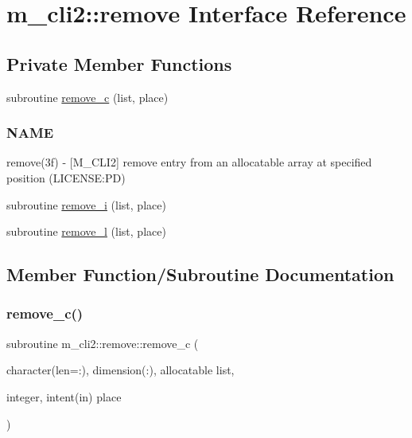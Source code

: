 \hypertarget{interfacem__cli2_1_1remove}{}\section{m\+\_\+cli2\+:\+:remove Interface Reference}
\label{interfacem__cli2_1_1remove}
\subsection*{Private Member Functions}
\begin{DoxyCompactItemize}
\item 
subroutine \mbox{\hyperlink{interfacem__cli2_1_1remove_aae13960af6c9ed2af46fdfec8e66a8a2}{remove\+\_\+c}} (list, place)
\begin{DoxyCompactList}\small\item\em \subsubsection*{N\+A\+ME}

remove(3f) -\/ \mbox{[}M\+\_\+\+C\+L\+I2\mbox{]} remove entry from an allocatable array at specified position (L\+I\+C\+E\+N\+SE\+:PD) \end{DoxyCompactList}\item 
subroutine \mbox{\hyperlink{interfacem__cli2_1_1remove_a4a30f737b41e6cfca58ef2842d633b27}{remove\+\_\+i}} (list, place)
\item 
subroutine \mbox{\hyperlink{interfacem__cli2_1_1remove_a72934a0b165dc3d178ff7cbe6117a5b3}{remove\+\_\+l}} (list, place)
\end{DoxyCompactItemize}


\subsection{Member Function/\+Subroutine Documentation}
\mbox{\label{interfacem__cli2_1_1remove_aae13960af6c9ed2af46fdfec8e66a8a2}} 
\subsubsection{\texorpdfstring{remove\+\_\+c()}{remove\_c()}}
{\footnotesize\ttfamily subroutine m\+\_\+cli2\+::remove\+::remove\+\_\+c (\begin{DoxyParamCaption}\item[{character(len=\+:), dimension(\+:), allocatable}]{list,  }\item[{integer, intent(in)}]{place }\end{DoxyParamCaption})\hspace{0.3cm}{\ttfamily [private]}}



